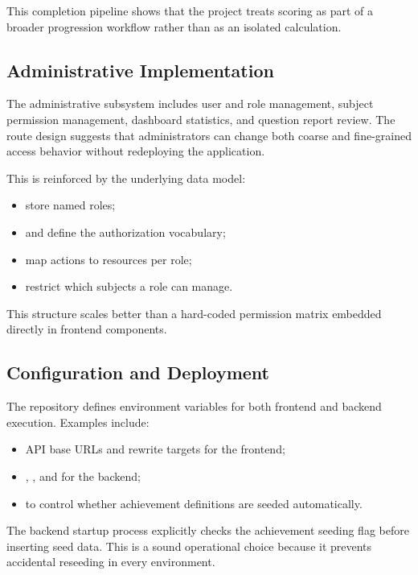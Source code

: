 This completion pipeline shows that the project treats scoring as part of a broader progression workflow rather than as an isolated calculation.

\subsection{Administrative Implementation}

The administrative subsystem includes user and role management, subject permission management, dashboard statistics, and question report review. The route design suggests that administrators can change both coarse and fine-grained access behavior without redeploying the application.

This is reinforced by the underlying data model:
\begin{itemize}
  \item {} store named roles;
  \item {} and  define the authorization vocabulary;
  \item {} map actions to resources per role;
  \item {} restrict which subjects a role can manage.
\end{itemize}

This structure scales better than a hard-coded permission matrix embedded directly in frontend components.

\subsection{Configuration and Deployment}

The repository defines environment variables for both frontend and backend execution. Examples include:
\begin{itemize}
  \item API base URLs and rewrite targets for the frontend;
  \item {}, , and  for the backend;
  \item {} to control whether achievement definitions are seeded automatically.
\end{itemize}

The backend startup process explicitly checks the achievement seeding flag before inserting seed data. This is a sound operational choice because it prevents accidental reseeding in every environment.

